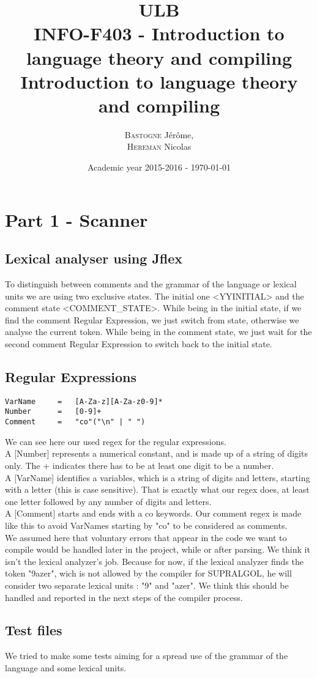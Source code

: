\documentclass[a4paper,10pt]{report}
\title{ULB\\
        INFO-F403 - Introduction to language theory and compiling \\
            Introduction to language theory and compiling}
\author{\textsc{Bastogne} Jérôme,\\
        \textsc{Hereman} Nicolas}
\date{Academic year 2015-2016 - \today}
\begin{document}
\maketitle
\clearpage


\chapter{Part 1 - Scanner}

\section{Lexical analyser using Jflex}

To distinguish between comments and the grammar of the language or lexical units we are using two exclusive states. The initial one <YYINITIAL> and the comment state <COMMENT\_STATE>. While being in the initial state, if we find the comment Regular Expression, we just switch from state, otherwise we analyse the current token. While being in the comment state, we just wait for the second comment Regular Expression to switch back to the initial state. 


\section{Regular Expressions}

\begin{lstlisting}
VarName		=	[A-Za-z][A-Za-z0-9]*
Number		=	[0-9]+
Comment		=	"co"("\n" | " ")
\end{lstlisting}
We can see here our used regex for the regular expressions.\\
A [Number] represents a numerical constant, and is made up of a string of digits only. The + indicates there has to be at least one digit to be a number.\\
A [VarName] identifies a variables, which is a string of digits and letters, starting with a letter (this is case sensitive). That is exactly what our regex does, at least one letter followed by any number of digits and letters.\\
A [Comment] starts and ends with a co keywords. Our comment regex is made like this to avoid VarNames starting by "co" to be considered as comments.\\
We assumed here that voluntary errors that appear in the code we want to compile would be handled later in the project, while or after parsing. We think it isn't the lexical analyzer's job. Because for now, if the lexical analyzer finds the token "9azer", wich is not allowed by the compiler for SUPRALGOL, he will consider two separate lexical units : "9" and "azer". We think this should be handled and reported in the next steps of the compiler process.



\section{Test files}

We tried to make some tests aiming for a spread use of the grammar of the language and some lexical units.
\end{document}
